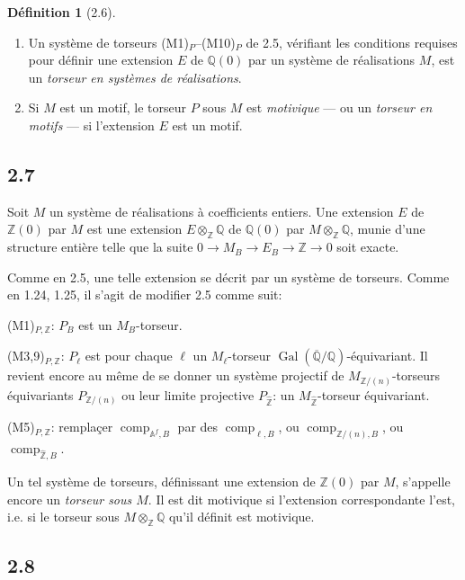 \documentclass[12pt,a4paper]{article}
\theoremstyle{plain}
\theoremstyle{definition}
\newtheorem{definition}[theorem]{D\'efinition}
\theoremstyle{remark}
\DeclareMathOperator{\Gal}{Gal}
\providecommand{\Gal}{\operatorname{Gal}}
\providecommand{\comp}{\operatorname{comp}}
\begin{document}
\begin{definition}[2.6]\label{def:2.6}
\leavevmode
\begin{enumerate}[label=(\roman*)]
\item Un syst\`eme de torseurs (M1)$_P$--(M10)$_P$ de 2.5, v\'erifiant les conditions
requises pour d\'efinir une extension $E$ de $\mathbb{Q}(0)$ par un syst\`eme de
r\'ealisations $M$, est un \emph{torseur en syst\`emes de r\'ealisations}.
\item Si $M$ est un motif, le torseur $P$ sous $M$ est \emph{motivique} --- ou un
\emph{torseur en motifs} --- si l'extension $E$ est un motif.
\end{enumerate}
\end{definition}

\subsection*{2.7}

Soit $M$ un syst\`eme de r\'ealisations \`a coefficients entiers. Une extension $E$ de
$\mathbb{Z}(0)$ par $M$ est une extension $E \otimes_{\mathbb{Z}} \mathbb{Q}$ de
$\mathbb{Q}(0)$ par $M \otimes_{\mathbb{Z}} \mathbb{Q}$, munie d'une structure enti\`ere
telle que la suite $0 \to M_B \to E_B \to \mathbb{Z} \to 0$ soit exacte.

Comme en 2.5, une telle extension se d\'ecrit par un syst\`eme de torseurs. Comme en
1.24, 1.25, il s'agit de modifier 2.5 comme suit:

(M1)$_{P,\mathbb{Z}}$: $P_B$ est un $M_B$-torseur.

(M3,9)$_{P,\mathbb{Z}}$: $P_\ell$ est pour chaque $\ell$ un $M_\ell$-torseur
$\Gal(\overline{\mathbb{Q}}/\mathbb{Q})$-\'equivariant. Il revient encore au m\^eme de se
donner un syst\`eme projectif de $M_{\mathbb{Z}/(n)}$-torseurs \'equivariants
$P_{\mathbb{Z}/(n)}$ ou leur limite projective $P_{\hat{\mathbb{Z}}}$: un
$M_{\hat{\mathbb{Z}}}$-torseur \'equivariant.

(M5)$_{P,\mathbb{Z}}$: rempla\c{c}er $\comp_{\mathbb{A}^f,B}$ par des
$\comp_{\ell,B}$, ou $\comp_{\mathbb{Z}/(n),B}$, ou $\comp_{\hat{\mathbb{Z}},B}$.

Un tel syst\`eme de torseurs, d\'efinissant une extension de $\mathbb{Z}(0)$ par $M$,
s'appelle encore un \emph{torseur sous $M$}. Il est dit motivique si l'extension
correspondante l'est, i.e. si le torseur sous $M \otimes_{\mathbb{Z}} \mathbb{Q}$ qu'il d\'efinit
est motivique.

\subsection*{2.8}
\end{document}
